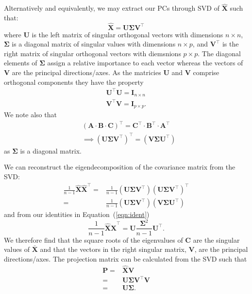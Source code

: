 Alternatively and equivalently, we may extract our PCs through SVD of  $\mathbf{\hat{X}}$ such that: 
\begin{equation}
    \mathbf{\hat{X}} = \mathbf{U}  \mathbf{\Sigma} \mathbf{ V^\top}
\end{equation}
where \textbf{U} is the left matrix of singular orthogonal vectors with dimensions $n \times n$,
$\mathbf{\Sigma}$ is a diagonal matrix of singular values with dimensions $n \times p$, 
and $\mathbf{V^{\top}}$ is the right matrix of singular  orthogonal vectors with diemsnions $p \times p$. 
The diagonal elements of $\mathbf{\Sigma}$ assign a  relative  importance  to  each  vector whereas the vectors of \textbf{V} are the principal directions/axes.
As the matricies \textbf{U} and \textbf{V} comprise orthogonal components they have the property
\begin{eqnarray}
\label{eqn:ident}
\mathbf{U^{\top}U}=\mathbf I_{n \times n} \\ \nonumber
\mathbf{V^{\top}V}=\mathbf I_{p \times p}.
\end{eqnarray}
We note also that 
\begin{eqnarray}
&\left(\mathbf {A \cdot B \cdot C }\right)^\top = \mathbf{C^\top \cdot B^\top \cdot A^\top} \\
&\implies  (\mathbf U\mathbf \Sigma\mathbf V^\top)^\top = (\mathbf V\mathbf \Sigma\mathbf U^\top)
\end{eqnarray}
as $\mathbf{\Sigma}$ is a diagonal matrix.


We can reconstruct the eigendecomposition of the covariance matrix from the SVD: 
\begin{eqnarray}
 \frac{1}{n-1}\mathbf{\hat{X}}\mathbf{\hat{X}}^\top = & \frac{1}{n-1} (\mathbf U\mathbf \Sigma\mathbf V^\top)(\mathbf U\mathbf \Sigma\mathbf V^\top)^\top\\[3pt] \nonumber
=& \frac{1}{n-1}(\mathbf U\mathbf \Sigma\mathbf V^\top)(\mathbf V\mathbf \Sigma\mathbf U^\top)
\end{eqnarray}
and from our identities in Equation~(\ref{eqn:ident})
\begin{equation}
 \frac{1}{n-1}\mathbf{\hat{X}}\mathbf{\hat{X}}^\top=\mathbf U \frac{\mathbf \Sigma^2}{n-1} \mathbf U^\top.
\end{equation}
We therefore find that the square roots of the eigenvalues of $\mathbf{C}$ are the singular values of  $\mathbf{\bar{X}}$ and that the vectors in the right singular matrix, \textbf{V}, are the principal directions/axes. The projection matrix can be calculated from the SVD such that 
\begin{eqnarray}
\mathbf{P} = &\mathbf{\hat{X}}  \mathbf{V} \\[3pt] \nonumber
           = & \mathbf U \mathbf \Sigma \mathbf V^\top \mathbf{V}  \\[3pt] \nonumber
           = & \mathbf U \mathbf \Sigma.
\end{eqnarray}

